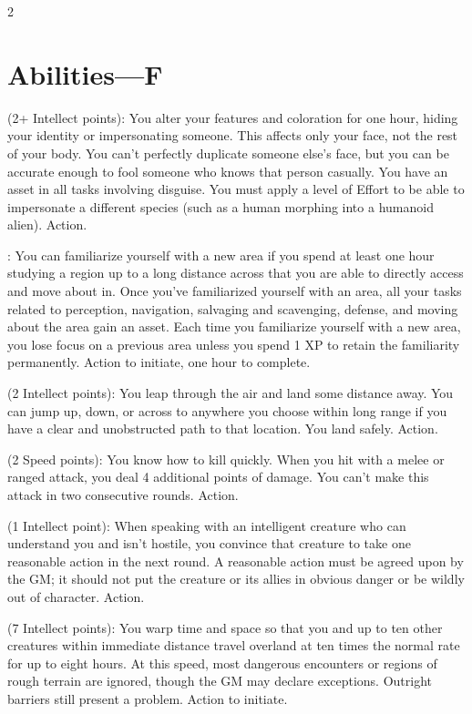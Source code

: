 \begin{multicols}{2}

\section{Abilities—F}

 (2+ Intellect points): You alter your features and coloration for one hour, hiding your identity or impersonating someone. This affects only your face, not the rest of your body. You can’t perfectly duplicate someone else’s face, but you can be accurate enough to fool someone who knows that person casually. You have an asset in all tasks involving disguise. You must apply a level of Effort to be able to impersonate a different species (such as a human morphing into a humanoid alien). Action. 
 
: You can familiarize yourself with a new area if you spend at least one hour studying a region up to a long distance across that you are able to directly access and move about in. Once you’ve familiarized yourself with an area, all your tasks related to perception, navigation, salvaging and scavenging, defense, and moving about the area gain an asset. Each time you familiarize yourself with a new area, you lose focus on a previous area unless you spend 1 XP to retain the familiarity permanently. Action to initiate, one hour to complete. 
 
 (2 Intellect points): You leap through the air and land some distance away. You can jump up, down, or across to anywhere you choose within long range if you have a clear and unobstructed path to that location. You land safely. Action. 
 
 (2 Speed points): You know how to kill quickly. When you hit with a melee or ranged attack, you deal 4 additional points of damage. You can’t make this attack in two consecutive rounds. Action.
 
 (1 Intellect point): When speaking with an intelligent creature who can understand you and isn’t hostile, you convince that creature to take one reasonable action in the next round. A reasonable action must be agreed upon by the GM; it should not put the creature or its allies in obvious danger or be wildly out of character. Action. 
 
 (7 Intellect points): You warp time and space so that you and up to ten other creatures within immediate distance travel overland at ten times the normal rate for up to eight hours. At this speed, most dangerous encounters or regions of rough terrain are ignored, though the GM may declare exceptions. Outright barriers still present a problem. Action to initiate. 


\end{multicols}
